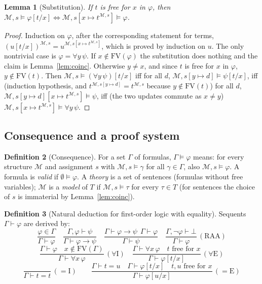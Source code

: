 \documentclass[11pt]{article}
\theoremstyle{definition}
\newtheorem{definition}{Definition}[section]
\theoremstyle{plain}
\newtheorem{lemma}[definition]{Lemma}
\theoremstyle{remark}
\begin{document}
\begin{lemma}[Substitution]\label{lem:subst}
If $t$ is free for $x$ in $\varphi$, then $\mathcal M,s\models\varphi[t/x]\iff\mathcal M,s[x\mapsto t^{\mathcal M,s}]\models\varphi$.
\end{lemma}
\begin{proof}
Induction on $\varphi$, after the corresponding statement for terms, $(u[t/x])^{\mathcal M,s}=u^{\mathcal M,s[x\mapsto t^{\mathcal M,s}]}$, which is proved by induction on $u$. The only nontrivial case is $\varphi=\forall y\,\psi$. If $x\notin\mathrm{FV}(\varphi)$ the substitution does nothing and the claim is Lemma~\ref{lem:coinc}. Otherwise $y\ne x$, and since $t$ is free for $x$ in $\varphi$, $y\notin\mathrm{FV}(t)$. Then $\mathcal M,s\models(\forall y\,\psi)[t/x]$ iff for all $d$, $\mathcal M,s[y\mapsto d]\models\psi[t/x]$, iff (induction hypothesis, and $t^{\mathcal M,s[y\mapsto d]}=t^{\mathcal M,s}$ because $y\notin\mathrm{FV}(t)$) for all $d$, $\mathcal M,s[y\mapsto d][x\mapsto t^{\mathcal M,s}]\models\psi$, iff (the two updates commute as $x\ne y$) $\mathcal M,s[x\mapsto t^{\mathcal M,s}]\models\forall y\,\psi$.
\end{proof}

\subsection{Consequence and a proof system}

\begin{definition}[Consequence]\label{def:conseq}
For a set $\Gamma$ of formulas, $\Gamma\models\varphi$ means: for every structure $\mathcal M$ and assignment $s$ with $\mathcal M,s\models\gamma$ for all $\gamma\in\Gamma$, also $\mathcal M,s\models\varphi$. A formula is \emph{valid} if $\emptyset\models\varphi$. A \emph{theory} is a set of sentences (formulas without free variables); $\mathcal M$ is a \emph{model} of $T$ if $\mathcal M,s\models\tau$ for every $\tau\in T$ (for sentences the choice of $s$ is immaterial by Lemma~\ref{lem:coinc}).
\end{definition}

\begin{definition}[Natural deduction for first-order logic with equality]\label{def:nd}
Sequents $\Gamma\vdash\varphi$ are derived by:
\[
\frac{\varphi\in\Gamma}{\Gamma\vdash\varphi}\quad
\frac{\Gamma,\varphi\vdash\psi}{\Gamma\vdash\varphi\to\psi}\quad
\frac{\Gamma\vdash\varphi\to\psi\ \ \Gamma\vdash\varphi}{\Gamma\vdash\psi}\quad
\frac{\Gamma,\neg\varphi\vdash\bot}{\Gamma\vdash\varphi}\,(\text{RAA})
\]
\[
\frac{\Gamma\vdash\varphi\quad x\notin\mathrm{FV}(\Gamma)}{\Gamma\vdash\forall x\,\varphi}\,(\forall\mathrm{I})\quad
\frac{\Gamma\vdash\forall x\,\varphi\quad t\text{ free for }x}{\Gamma\vdash\varphi[t/x]}\,(\forall\mathrm{E})
\]
\[
\frac{}{\Gamma\vdash t=t}\,(=\mathrm{I})\qquad
\frac{\Gamma\vdash t=u\quad\Gamma\vdash\varphi[t/x]\quad t,u\text{ free for }x}{\Gamma\vdash\varphi[u/x]}\,(=\mathrm{E})
\]
\end{definition}
\end{document}
